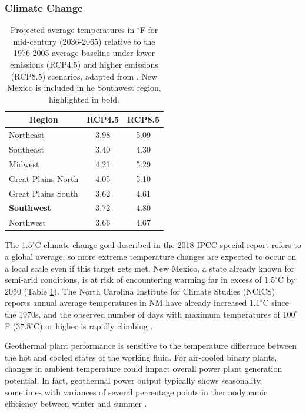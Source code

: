 \subsubsection{Climate Change}
\label{ch4:uncert_climate}

\begin{table}
\centering
\begin{tabular}{|l|c|c|}
\hline
\multicolumn{1}{|c|}{\textbf{Region}} & \textbf{RCP4.5} & \textbf{RCP8.5} \\ \hline
Northeast & 3.98 & 5.09 \\ \hline
Southeast & 3.40 & 4.30 \\ \hline
Midwest & 4.21 & 5.29 \\ \hline
Great Plains North & 4.05 & 5.10 \\ \hline
Great Plains South & 3.62 & 4.61 \\ \hline
\textbf{Southwest} & 3.72 & 4.80 \\ \hline
Northwest & 3.66 & 4.67 \\ \hline
\end{tabular}
\caption[Projected regional temperature changes]{Projected average temperatures in $^\circ$F for mid-century (2036-2065) relative to the 1976-2005 average baseline under lower emissions (RCP4.5) and higher emissions (RCP8.5) scenarios, adapted from \protect\citep[Table 6.4]{vose_temperature_2017}. New Mexico is included in he Southwest region, highlighted in bold.}
\label{tab:reg_climate}
\end{table}

The $1.5^\circ$C climate change goal described in the 2018 IPCC special report \citep{ipcc_global_2018} refers to a global average, so more extreme temperature changes are expected to occur on a local scale even if this target gets met. New Mexico, a state already known for semi-arid conditions, is at risk of encountering warming far in excess of $1.5^\circ$C by 2050 (Table \ref{tab:reg_climate}). The North Carolina Institute for Climate Studies (NCICS) reports annual average temperatures in NM have already increased $1.1^\circ$C since the 1970s, and the observed number of days with maximum temperatures of $100^\circ$F ($37.8^\circ$C) or higher is rapidly climbing \citep{frankson_new_2019}.

Geothermal plant performance is sensitive to the temperature difference between the hot and cooled states of the working fluid. For air-cooled binary plants, changes in ambient temperature could impact overall power plant generation potential. In fact, geothermal power output typically shows seasonality, sometimes with variances of several percentage points in thermodynamic efficiency between winter and summer \citep[p.\ 52]{glassley_geothermal_2015}.  

